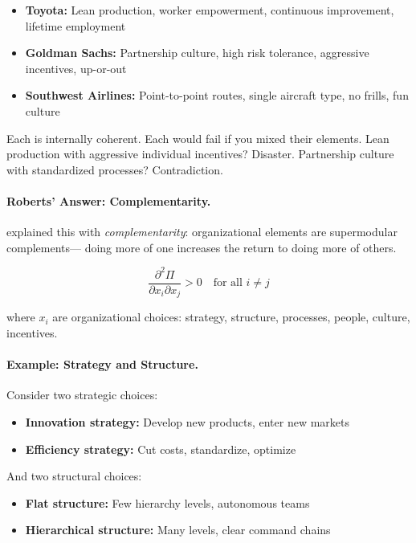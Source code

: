 \documentclass[12pt,a4paper]{article}
\begin{document}
\begin{itemize}
  \item \textbf{Toyota:} Lean production, worker empowerment, continuous improvement, lifetime employment
  \item \textbf{Goldman Sachs:} Partnership culture, high risk tolerance, aggressive incentives, up-or-out
  \item \textbf{Southwest Airlines:} Point-to-point routes, single aircraft type, no frills, fun culture
\end{itemize}

Each is internally coherent. Each would fail if you mixed their elements.
Lean production with aggressive individual incentives? Disaster.
Partnership culture with standardized processes? Contradiction.

\paragraph{Roberts' Answer: Complementarity.}
\citet{roberts2004} explained this with \emph{complementarity}:
organizational elements are supermodular complements---
doing more of one increases the return to doing more of others.

\begin{equation}
  \frac{\partial^2 \Pi}{\partial x_i \partial x_j} > 0 
  \quad \text{for all } i \neq j
  \label{eq:supermodularity-org}
\end{equation}

where $x_i$ are organizational choices: strategy, structure, processes, 
people, culture, incentives.

\paragraph{Example: Strategy and Structure.}
Consider two strategic choices:
\begin{itemize}
  \item \textbf{Innovation strategy:} Develop new products, enter new markets
  \item \textbf{Efficiency strategy:} Cut costs, standardize, optimize
\end{itemize}

And two structural choices:
\begin{itemize}
  \item \textbf{Flat structure:} Few hierarchy levels, autonomous teams
  \item \textbf{Hierarchical structure:} Many levels, clear command chains
\end{itemize}
\end{document}
